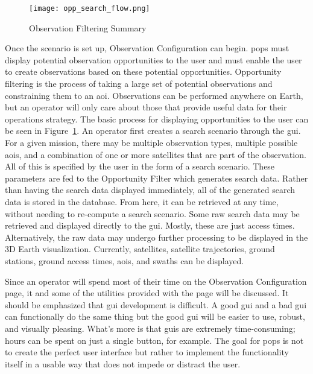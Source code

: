 \begin{figure}[h]
    \centering
    \texttt{[image: opp\_search\_flow.png]} 
    \caption{Observation Filtering Summary}
    \label{fig:obs_fil} 
\end{figure}

Once the scenario is set up, Observation Configuration can begin. \gls{pops}
must display potential observation opportunities to the user and must enable
the user to create observations based on these potential opportunities.
Opportunity filtering is the process of taking a large set of potential
observations and constraining them to an \gls{aoi}. Observations can be
performed anywhere on Earth, but an operator will only care about those that
provide useful data for their operations strategy.  The basic process for
displaying opportunities to the user can be seen in Figure~\ref{fig:obs_fil}.
An operator first creates a search scenario through the \gls{gui}.  For a given
mission, there may be multiple observation types, multiple possible
\glspl{aoi}, and a combination of one or more satellites that are part of the
observation. All of this is specified by the user in the form of a search
scenario. These parameters are fed to the Opportunity Filter which generates
search data.  Rather than having the search data displayed immediately, all of
the generated search data is stored in the database. From here, it can be
retrieved at any time, without needing to re-compute a search scenario. Some
raw search data may be retrieved and displayed directly to the \gls{gui}.
Mostly, these are just access times.  Alternatively, the raw data may undergo
further processing to be displayed in the 3D Earth visualization. Currently,
satellites, satellite trajectories, ground stations, ground access times,
\glspl{aoi}, and swaths can be displayed.


Since an operator will spend most of their time on the Observation
Configuration page, it and some of the utilities provided with the page will be
discussed.  It should be emphasized that \gls{gui}  development is difficult.
A good \gls{gui} and a bad \gls{gui} can functionally do the same thing but the
good \gls{gui} will be easier to use, robust, and visually pleasing. What's
more is that \glspl{gui} are extremely time-consuming; hours can be spent on
just a single button, for example. The goal for \gls{pops} is not to create the
perfect user interface but rather to implement the functionality itself in a
usable way that does not impede or distract the user.

